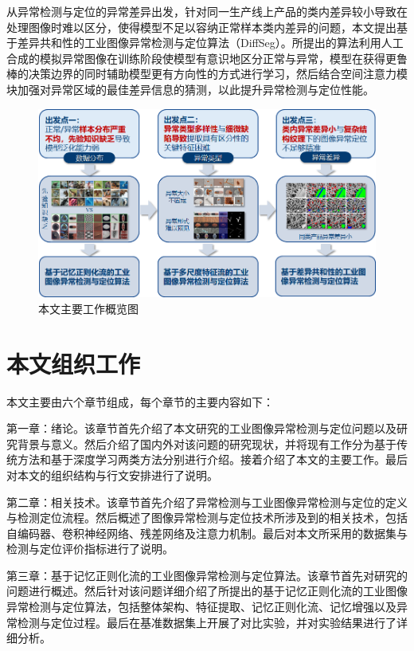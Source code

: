 \documentclass[lang=chs, degree=master, blindreview=false, adobe=false]{yanputhesis}
\begin{document}
从异常检测与定位的异常差异出发，针对同一生产线上产品的类内差异较小导致在处理图像时难以区分，使得模型不足以容纳正常样本类内差异的问题，本文提出基于差异共和性的工业图像异常检测与定位算法（DiffSeg）。所提出的算法利用人工合成的模拟异常图像在训练阶段使模型有意识地区分正常与异常，模型在获得更鲁棒的决策边界的同时辅助模型更有方向性的方式进行学习，然后结合空间注意力模块加强对异常区域的最佳差异信息的猜测，以此提升异常检测与定位性能。

\begin{figure}[htb]
	\centering
	\includegraphics[width=1\linewidth]{figs/本文工作.png}
	\caption{本文主要工作概览图}
	\label{fig:Main Work}
\end{figure}

\section{本文组织工作}

本文主要由六个章节组成，每个章节的主要内容如下：

第一章：绪论。该章节首先介绍了本文研究的工业图像异常检测与定位问题以及研究背景与意义。然后介绍了国内外对该问题的研究现状，并将现有工作分为基于传统方法和基于深度学习两类方法分别进行介绍。接着介绍了本文的主要工作。最后对本文的组织结构与行文安排进行了说明。

第二章：相关技术。该章节首先介绍了异常检测与工业图像异常检测与定位的定义与检测定位流程。然后概述了图像异常检测与定位技术所涉及到的相关技术，包括自编码器、卷积神经网络、残差网络及注意力机制。最后对本文所采用的数据集与检测与定位评价指标进行了说明。

第三章：基于记忆正则化流的工业图像异常检测与定位算法。该章节首先对研究的问题进行概述。然后针对该问题详细介绍了所提出的基于记忆正则化流的工业图像异常检测与定位算法，包括整体架构、特征提取、记忆正则化流、记忆增强以及异常检测与定位过程。最后在基准数据集上开展了对比实验，并对实验结果进行了详细分析。
\end{document}
